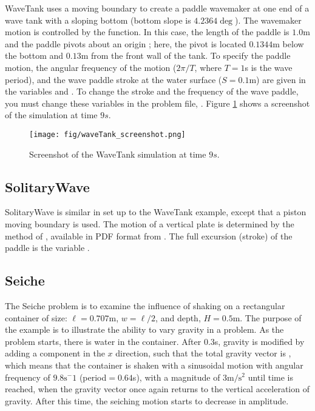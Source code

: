 WaveTank uses a moving boundary to create a paddle wavemaker at one end
of a wave tank with a sloping bottom (bottom slope is $4.2364\deg$). The
wavemaker motion is controlled by the  function. In
this case, the length of the paddle is $1.0$m and the paddle pivots
about an origin ; here, the pivot is located $0.1344$m
below the bottom and $0.13$m from the front wall of the tank. To specify
the paddle motion, the angular frequency of the motion ($2 \pi/T$, where
$T=1$s is the wave period), and the wave paddle stroke at the water
surface ($S=0.1$m) are given in the variables  and
. To change the stroke and the frequency of the wave
paddle, you must change these variables in the problem file,
.
Figure \ref{fig:WaveTank} shows a screenshot of the simulation at time $9s$.

\iffalse
\begin{figure}[h]
\centering{%
\texttt{[image: paddle.png]}%
}
\caption{Schematic of the wave paddle for \cmd{WaveTank.cc}}
\end{figure}
\else
\fi

\begin{figure}[h]
  \begin{center}
    \texttt{[image: fig/waveTank\_screenshot.png]}
    \caption{Screenshot of the WaveTank simulation at time $9s$.}\label{fig:WaveTank}   
  \end{center}
\end{figure}

\subsection{SolitaryWave}

SolitaryWave is similar in set up to the WaveTank example, except that a
piston moving boundary is used. The motion of a vertical plate is
determined by the method of \cite{goring_tsunamis_1979}, available in PDF format
from . The full
excursion (stroke) of the paddle is the variable .

\subsection{Seiche}

The Seiche problem is to examine the influence of shaking on a
rectangular container of size: $\ell = 0.707$m, $w = \ell/2$, and depth,
$H = 0.5$m. The purpose of the example is to illustrate the ability to
vary gravity in a problem. As the problem starts, there is water in the
container. After $0.3$s, gravity is modified by adding a component in
the $x$ direction, such that the total gravity vector is
, which means that the container is shaken with a sinusoidal
motion with angular frequency of $9.8\text{s}^-1$ (period${} = 0.64$s),
with a magnitude of $3\text{m}/\text{s}^2$ until time 
is reached, when the gravity vector once again returns to the vertical
acceleration of gravity. After this time, the seiching motion starts to
decrease in amplitude.

